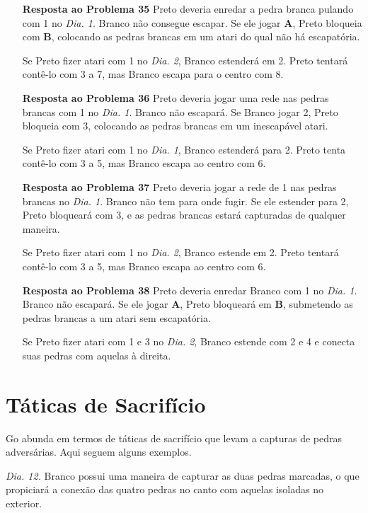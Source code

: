 \begin{itemize}
    \item[\textbf{Resposta ao Problema 35}] Preto deveria enredar a pedra branca pulando com 1 no \emph{Dia. 1}. Branco não consegue escapar. Se ele jogar \textbf{A}, Preto bloqueia com \textbf{B}, colocando as pedras brancas em um atari do qual não há escapatória.

        Se Preto fizer atari com 1 no \emph{Dia. 2}, Branco estenderá em 2. Preto tentará contê-lo com 3 a 7, mas Branco escapa para o centro com 8.
    \item[\textbf{Resposta ao Problema 36}] Preto deveria jogar uma rede nas pedras brancas com 1 no \emph{Dia. 1}. Branco não escapará. Se Branco jogar 2, Preto bloqueia com 3, colocando as pedras brancas em um inescapável atari.
    
        Se Preto fizer atari com 1 no \emph{Dia. 1}, Branco estenderá para 2. Preto tenta contê-lo com 3 a 5, mas Branco escapa ao centro com 6.
    \item[\textbf{Resposta ao Problema 37}] Preto deveria jogar a rede de 1 nas pedras brancas no \emph{Dia. 1}. Branco não tem para onde fugir. Se ele estender para 2, Preto bloqueará com 3, e as pedras brancas estará capturadas de qualquer maneira.
    
        Se Preto fizer atari com 1 no \emph{Dia. 2}, Branco estende em 2. Preto tentará contê-lo com 3 a 5, mas Branco escapa ao centro com 6.
    \item[\textbf{Resposta ao Problema 38}] Preto deveria enredar Branco com 1 no \emph{Dia. 1}. Branco não escapará. Se ele jogar \textbf{A}, Preto bloqueará em \textbf{B}, submetendo as pedras brancas a um atari sem escapatória.
    
        Se Preto fizer atari com 1 e 3 no \emph{Dia. 2}, Branco estende com 2 e 4 e conecta suas pedras com aquelas à direita.
\end{itemize}

\section{Táticas de Sacrifício}

Go abunda em termos de táticas de sacrifício que levam a capturas de pedras adversárias. Aqui seguem alguns exemplos.

\emph{Dia. 12.} Branco possui uma maneira de capturar as duas pedras marcadas, o que propiciará a conexão das quatro pedras no canto com aquelas isoladas no exterior.

